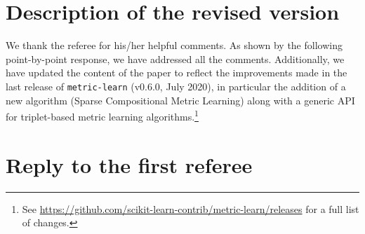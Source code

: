 \documentclass[a4paper,12pt]{article}
\author{W. de Vazelhes, CJ Carey, Y. Tang, N. Vauquier, A. Bellet}
\date{\today}
\begin{document}
\maketitle


\section{Description of the revised version}

We thank the referee for his/her helpful comments. As shown by the following
point-by-point response, we have addressed all the comments. Additionally, we have updated the content of the paper to reflect the
improvements made in the last release of \texttt{metric-learn} (v0.6.0, July
2020), in particular the addition of a new algorithm (Sparse Compositional Metric Learning) along with a generic API for triplet-based metric learning algorithms.\footnote{See \url{https://github.com/scikit-learn-contrib/metric-learn/releases} for a full list of changes.}


\newpage
\section{Reply to the first referee}
\end{document}
